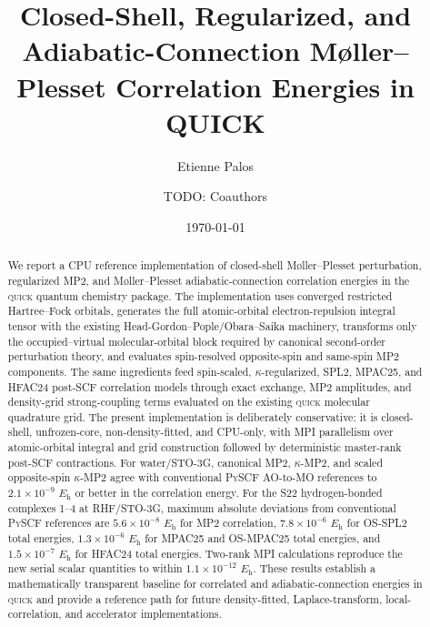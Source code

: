 \documentclass[aip,jcp,reprint,superscriptaddress]{revtex4-2}
\newcommand{\quick}{\textsc{quick}}
\newcommand{\pyscf}{\textsc{PySCF}}
\newcommand{\Eh}{E_{\mathrm{h}}}
\begin{document}
\title{Closed-Shell, Regularized, and Adiabatic-Connection M\o{}ller--Plesset Correlation Energies in QUICK}

\author{Etienne Palos}

\author{TODO: Coauthors}

\date{\today}

\begin{abstract}
We report a CPU reference implementation of closed-shell M\o{}ller--Plesset perturbation, regularized MP2, and M\o{}ller--Plesset adiabatic-connection correlation energies in the \quick{} quantum chemistry package.  The implementation uses converged restricted Hartree--Fock orbitals, generates the full atomic-orbital electron-repulsion integral tensor with the existing Head-Gordon--Pople/Obara--Saika machinery, transforms only the occupied--virtual molecular-orbital block required by canonical second-order perturbation theory, and evaluates spin-resolved opposite-spin and same-spin MP2 components.  The same ingredients feed spin-scaled, \(\kappa\)-regularized, SPL2, MPAC25, and HFAC24 post-SCF correlation models through exact exchange, MP2 amplitudes, and density-grid strong-coupling terms evaluated on the existing \quick{} molecular quadrature grid.  The present implementation is deliberately conservative: it is closed-shell, unfrozen-core, non-density-fitted, and CPU-only, with MPI parallelism over atomic-orbital integral and grid construction followed by deterministic master-rank post-SCF contractions.  For water/STO-3G, canonical MP2, \(\kappa\)-MP2, and scaled opposite-spin \(\kappa\)-MP2 agree with conventional \pyscf{} AO-to-MO references to \(2.1\times10^{-9}\) \(\Eh\) or better in the correlation energy.  For the S22 hydrogen-bonded complexes 1--4 at RHF/STO-3G, maximum absolute deviations from conventional \pyscf{} references are \(5.6\times10^{-8}\) \(\Eh\) for MP2 correlation, \(7.8\times10^{-6}\) \(\Eh\) for OS-SPL2 total energies, \(1.3\times10^{-6}\) \(\Eh\) for MPAC25 and OS-MPAC25 total energies, and \(1.5\times10^{-7}\) \(\Eh\) for HFAC24 total energies.  Two-rank MPI calculations reproduce the new serial scalar quantities to within \(1.1\times10^{-12}\) \(\Eh\).  These results establish a mathematically transparent baseline for correlated and adiabatic-connection energies in \quick{} and provide a reference path for future density-fitted, Laplace-transform, local-correlation, and accelerator implementations.
\end{abstract}
\end{document}
